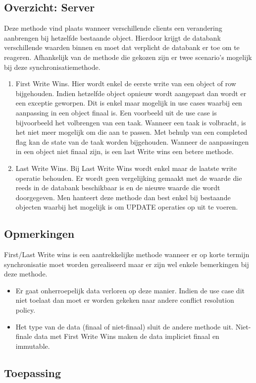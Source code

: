 \subsection{Overzicht: Server}
Deze methode vind plaats wanneer verschillende clients een verandering aanbrengen bij hetzelfde bestaande object. Hierdoor krijgt de databank verschillende waarden binnen en moet dat verplicht de databank er toe om te reageren. Afhankelijk van de methode die gekozen zijn er twee scenario's mogelijk bij deze synchronisatiemethode.
\begin{enumerate}
\item First Write Wins. Hier wordt enkel de eerste write van een object of row bijgehouden. Indien hetzelfde object opnieuw wordt aangepast dan wordt er een exceptie geworpen. Dit is enkel maar mogelijk in use cases waarbij een aanpassing in een object finaal is. Een voorbeeld uit de use case is bijvoorbeeld het volbrengen van een taak. Wanneer een taak is volbracht, is het niet meer mogelijk om die aan te passen. Met behulp van een completed flag kan de state van de taak worden bijgehouden. Wanneer de aanpassingen in een object niet finaal zijn, is een last Write wins een betere methode.
\item Last Write Wins. Bij Last Write Wins wordt enkel maar de laatste write operatie behouden. Er wordt geen vergelijking gemaakt met de waarde die reeds in de databank beschikbaar is en de nieuwe waarde die wordt doorgegeven. Men hanteert deze methode dan best enkel bij bestaande objecten waarbij het mogelijk is om UPDATE operaties op uit te voeren.
\end{enumerate}
\subsection{Opmerkingen}
First/Last Write wins is een aantrekkelijke methode wanneer er op korte termijn synchronisatie moet worden gerealiseerd maar er zijn wel enkele bemerkingen bij deze methode.
\begin{itemize}
\item Er gaat onherroepelijk data verloren op deze manier. Indien de use case dit niet toelaat dan moet er worden gekeken naar andere conflict resolution policy.
\item Het type van de data (finaal of niet-finaal) sluit de andere methode uit. Niet-finale data met First Write Wins maken de data impliciet finaal en immutable.
\end{itemize}
\subsection{Toepassing}
